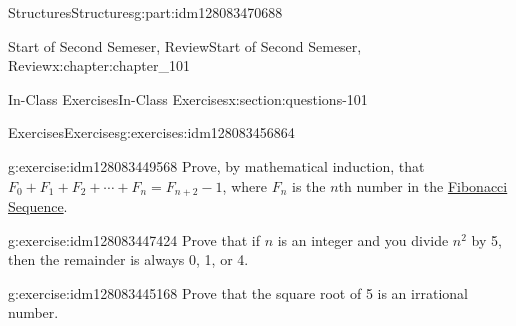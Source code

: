 \documentclass[oneside,10pt,]{book}
\numberwithin{equation}{section}
\begin{document}
\begin{partptx}{Structures}{}{Structures}{}{}{g:part:idm128083470688}
\begin{chapterptx}{Start of Second Semeser, Review}{}{Start of Second Semeser, Review}{}{}{x:chapter:chapter_101}
\begin{sectionptx}{In-Class Exercises}{}{In-Class Exercises}{}{}{x:section:questions-101}
\begin{exercises-subsection}{Exercises}{}{Exercises}{}{}{g:exercises:idm128083456864}
\begin{exercisegroup}
\begin{divisionexerciseeg}{4}{}{}{g:exercise:idm128083449568}%
Prove, by mathematical induction, that \(F_0 + F_1 + F_2 + \cdots + F_{n} = F_{n+2} - 1\), where \(F_n\) is the \(n\)th number in the \hyperref[x:section:def-fibonacci-sequence]{Fibonacci Sequence}.%
\end{divisionexerciseeg}%
\begin{divisionexerciseeg}{5}{}{}{g:exercise:idm128083447424}%
Prove that if \(n\) is an integer and you divide \(n^2\) by 5, then the remainder is always 0, 1, or 4.%
\end{divisionexerciseeg}%
\begin{divisionexerciseeg}{6}{}{}{g:exercise:idm128083445168}%
Prove that the square root of 5 is an irrational number.%
\end{divisionexerciseeg}%
\end{exercisegroup}
\par\medskip\noindent
\end{exercises-subsection}
\end{sectionptx}
\end{chapterptx}
\end{partptx}
%
\backmatter
%
%
%
%
%
\typeout{************************************************}
\typeout{************************************************}
%
\end{document}
